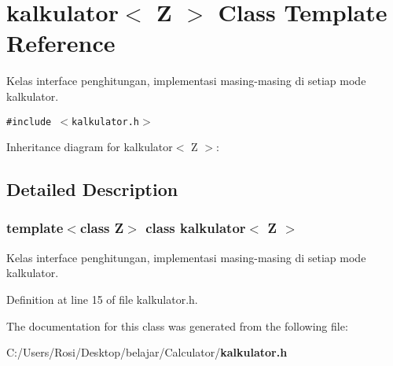 \section{kalkulator$<$ Z $>$ Class Template Reference}
\label{classkalkulator}
Kelas interface penghitungan, implementasi masing-masing di setiap mode kalkulator.  


{\tt \#include $<$kalkulator.h$>$}

Inheritance diagram for kalkulator$<$ Z $>$:

\subsection{Detailed Description}
\subsubsection*{template$<$class Z$>$ class kalkulator$<$ Z $>$}

Kelas interface penghitungan, implementasi masing-masing di setiap mode kalkulator. 



Definition at line 15 of file kalkulator.h.

The documentation for this class was generated from the following file:\begin{CompactItemize}
\item 
C:/Users/Rosi/Desktop/belajar/Calculator/{\bf kalkulator.h}\end{CompactItemize}
